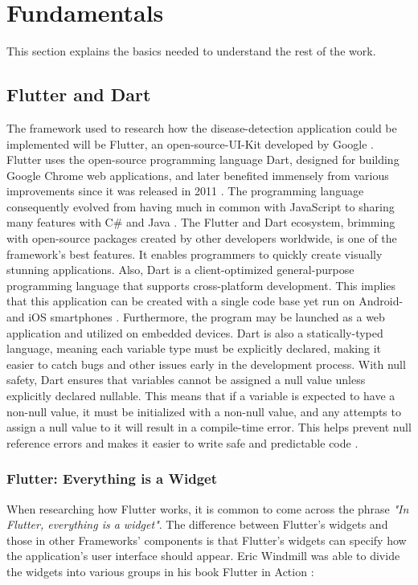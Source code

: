 \chapter{Fundamentals}
This section explains the basics needed to understand the rest of the work.

\section{Flutter and Dart}
The framework used to research how the disease-detection application could be implemented will be Flutter, an open-source-UI-Kit developed by Google \cite{.flutterDEV}. Flutter uses the open-source programming language Dart, designed for building Google Chrome web applications, and later benefited immensely from various improvements since it was released in 2011 \cite{whatisdart}. The programming language consequently evolved from having much in common with JavaScript to sharing many features with C\# and Java \cite{.javadart}. The Flutter and Dart ecosystem, brimming with open-source packages created by other developers worldwide, is one of the framework's best features. It enables programmers to quickly create visually stunning applications. Also, Dart is a client-optimized general-purpose programming language that supports cross-platform development. This implies that this application can be created with a single code base yet run on Android- and iOS smartphones \cite{.dartoverview}.
Furthermore, the program may be launched as a web application and utilized on embedded devices. Dart is also a statically-typed language, meaning each variable type must be explicitly declared, making it easier to catch bugs and other issues early in the development process. With null safety, Dart ensures that variables cannot be assigned a null value unless explicitly declared nullable. This means that if a variable is expected to have a non-null value, it must be initialized with a non-null value, and any attempts to assign a null value to it will result in a compile-time error. This helps prevent null reference errors and makes it easier to write safe and predictable code \cite{.dartoverview}.

\subsection{Flutter: Everything is a Widget}
When researching how Flutter works, it is common to come across the phrase \emph{"In Flutter, everything is a widget"}. The difference between Flutter's widgets and those in other Frameworks' components is that Flutter's widgets can specify how the application's user interface should appear. Eric Windmill was able to divide the widgets into various groups in his book Flutter in Action \cite[p. 58]{.flutterinaction}:

